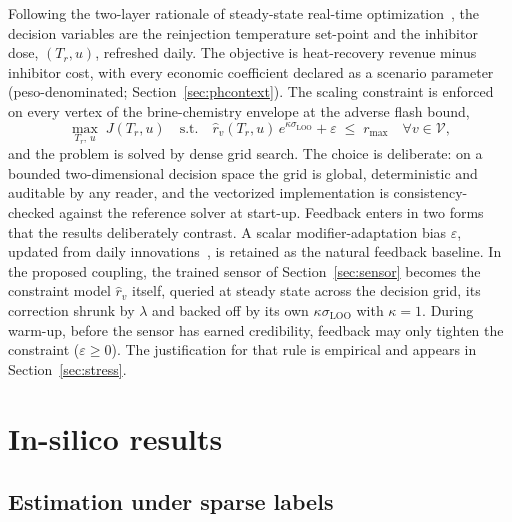 \documentclass[review,number,sort&compress]{elsarticle}
\begin{document}
Following the two-layer rationale of steady-state real-time
optimization~\citep{darby2011rto}, the decision variables are the
reinjection temperature set-point and the inhibitor dose, $(T_r, u)$,
refreshed daily. The objective is heat-recovery revenue minus inhibitor
cost, with every economic coefficient declared as a scenario parameter
(peso-denominated; Section~\ref{sec:phcontext}). The scaling constraint
is enforced on every vertex of the brine-chemistry envelope at the
adverse flash bound,
\begin{equation}\label{eq:rto}
\max_{T_r,\,u}\; J(T_r, u)
\quad \text{s.t.} \quad
\hat r_v(T_r, u)\, e^{\kappa \sigma_{\mathrm{LOO}}} + \varepsilon
\;\le\; r_{\max} \quad \forall v \in \mathcal{V},
\end{equation}
and the problem is solved by dense grid search. The choice is
deliberate: on a bounded two-dimensional decision space the grid is
global, deterministic and auditable by any reader, and the vectorized
implementation is consistency-checked against the reference solver at
start-up. Feedback enters in two forms that the results deliberately
contrast. A scalar modifier-adaptation bias $\varepsilon$, updated from
daily innovations~\citep{marchetti2009modifier,marchetti2010dual}, is
retained as the natural feedback baseline. In the proposed coupling,
the trained sensor of Section~\ref{sec:sensor} becomes the constraint
model $\hat r_v$ itself, queried at steady state across the decision
grid, its correction shrunk by $\lambda$ and backed off by its own
$\kappa\sigma_{\mathrm{LOO}}$ with $\kappa = 1$. During warm-up, before
the sensor has earned credibility, feedback may only tighten the
constraint ($\varepsilon \ge 0$). The justification for that rule is
empirical and appears in Section~\ref{sec:stress}.

\section{In-silico results}\label{sec:results}

\subsection{Estimation under sparse labels}\label{sec:table1}
\end{document}
